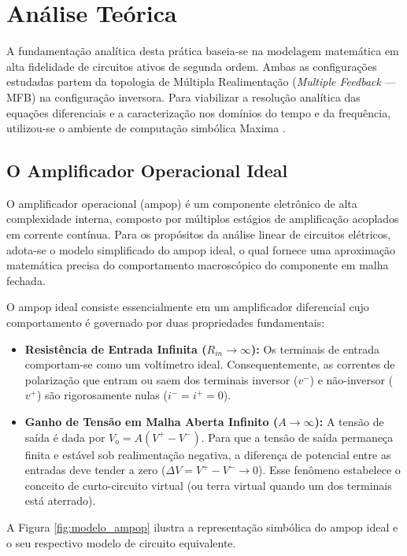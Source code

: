 \chapter{Análise Teórica}

A fundamentação analítica desta prática baseia-se na modelagem matemática em alta fidelidade de circuitos ativos de segunda ordem. Ambas as configurações estudadas partem da topologia de Múltipla Realimentação (\textit{Multiple Feedback} — MFB) na configuração inversora. Para viabilizar a resolução analítica das equações diferenciais e a caracterização nos domínios do tempo e da frequência, utilizou-se o ambiente de computação simbólica Maxima \cite{maxima}.

\section{O Amplificador Operacional Ideal}

O amplificador operacional (ampop) é um componente eletrônico de alta complexidade interna, composto por múltiplos estágios de amplificação acoplados em corrente contínua. Para os propósitos da análise linear de circuitos elétricos, adota-se o modelo simplificado do ampop ideal, o qual fornece uma aproximação matemática precisa do comportamento macroscópico do componente em malha fechada.

O ampop ideal consiste essencialmente em um amplificador diferencial cujo comportamento é governado por duas propriedades fundamentais:

\begin{itemize}
	\item \textbf{Resistência de Entrada Infinita ($R_{in} \to \infty$):} Os terminais de entrada comportam-se como um voltímetro ideal. Consequentemente, as correntes de polarização que entram ou saem dos terminais inversor ($v^-$) e não-inversor ($v^+$) são rigorosamente nulas ($i^- = i^+ = 0$).
	\item \textbf{Ganho de Tensão em Malha Aberta Infinito ($A \to \infty$):} A tensão de saída é dada por $V_o = A(V^+ - V^-)$. Para que a tensão de saída permaneça finita e estável sob realimentação negativa, a diferença de potencial entre as entradas deve tender a zero ($\Delta V = V^+ - V^- \to 0$). Esse fenômeno estabelece o conceito de curto-circuito virtual (ou terra virtual quando um dos terminais está aterrado).
\end{itemize}

A Figura \ref{fig:modelo_ampop} ilustra a representação simbólica do ampop ideal e o seu respectivo modelo de circuito equivalente.

